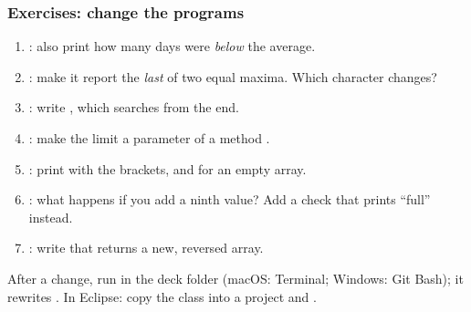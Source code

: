 \documentclass[aspectratio=169,10pt,compress]{beamer}
\begin{document}
\begin{frame}[t,fragile] \frametitle{Exercises: change the programs}
	\begin{enumerate}\small
		\item {}: also print how many days were \emph{below} the average.
		\item {}: make it report the \emph{last} of two equal maxima. Which character changes?
		\item {}: write , which searches from the end.
		\item {}: make the limit a parameter of a method
		      .
		\item {}: print \hCode{[72, 85, 90]} with the brackets, and \hCode{[]} for an empty array.
		\item {}: what happens if you add a ninth value? Add a check that prints
		      ``full'' instead.
		\item {}: write  that returns a new, reversed array.
	\end{enumerate}

	\vspace{0.5em}
	\small After a change, run  in the deck folder
	(macOS: Terminal; Windows: Git Bash); it rewrites .
	In Eclipse: copy the class into a project and .
\end{frame}




\begin{frame}[t,fragile]
	\begin{center}
		\vspace{4cm}
	\end{center}
\end{frame}
\end{document}
